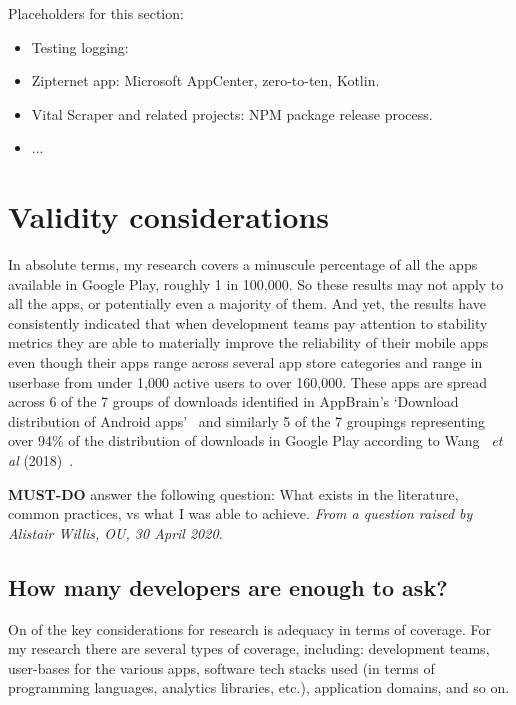 Placeholders for this section:
\begin{itemize}
    \item Testing logging:
    \item Zipternet app: Microsoft AppCenter, zero-to-ten, Kotlin.
    \item Vital Scraper and related projects: NPM package release process.
    \item ...
\end{itemize}



\section{Validity considerations}
In absolute terms, my research covers a minuscule percentage of all the apps available in Google Play, roughly 1 in 100,000. So these results may not apply to all the apps, or potentially even a majority of them. And yet, the results have consistently indicated that when development teams pay attention to stability metrics they are able to materially improve the reliability of their mobile apps even though their apps range across several app store categories and range in userbase from under 1,000 active users to over 160,000. These apps are spread across 6 of the 7 groups of downloads identified in AppBrain's `Download distribution of Android apps'~\cite{appbrain_download_statistics_june_2019} and similarly 5 of the 7 groupings representing over 94\% of the distribution of downloads in Google Play according to Wang ~\emph{et al} (2018)~\cite{wang2018_beyond_google_play}.

\textbf{MUST-DO} answer the following question: What exists in the literature, common practices, vs what I was able to achieve. \emph{From a question raised by Alistair Willis, OU, 30 April 2020.}

\subsection{How many developers are enough to ask?}
On of the key considerations for research is adequacy in terms of coverage. For my research there are several types of coverage, including: development teams, user-bases for the various apps, software tech stacks used (in terms of programming languages, analytics libraries, etc.), application domains, and so on. 

